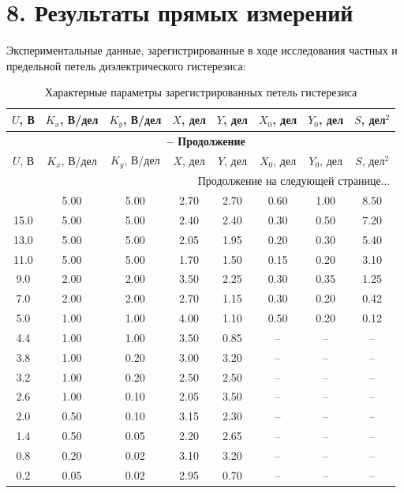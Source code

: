 \documentclass[a4paper,12pt]{article}
\begin{document}
\section*{\hspace{30pt}8. Результаты прямых измерений}
\hspace{15pt} Экспериментальные данные, зарегистрированные в ходе исследования частных и предельной петель диэлектрического гистерезиса:
\begin{longtable}{|c|c|c|c|c|c|c|c|}
    \caption{Характерные параметры зарегистрированных петель гистерезиса} \label{tab:raw_data_306} \\
    \hline
    $U$, В & $K_x$, В/дел & $K_y$, В/дел & $X$, дел & $Y$, дел & $X_0$, дел & $Y_0$, дел & $S$, дел$^2$ \\ \hline
    \endfirsthead
    \multicolumn{8}{c}{{\bfseries \tablename\ \thetable{} -- Продолжение}} \\ \hline
    $U$, В & $K_x$, В/дел & $K_y$, В/дел & $X$, дел & $Y$, дел & $X_0$, дел & $Y_0$, дел & $S$, дел$^2$ \\ \hline
    \endhead
    \hline \multicolumn{8}{|r|}{{Продолжение на следующей странице...}} \\ \hline
    \endfoot
    \hline
    \endlastfoot
    17.0 & 5.00 & 5.00 & 2.70 & 2.70 & 0.60 & 1.00 & 8.50 \\ \hline
    15.0 & 5.00 & 5.00 & 2.40 & 2.40 & 0.30 & 0.50 & 7.20 \\ \hline
    13.0 & 5.00 & 5.00 & 2.05 & 1.95 & 0.20 & 0.30 & 5.40 \\ \hline
    11.0 & 5.00 & 5.00 & 1.70 & 1.50 & 0.15 & 0.20 & 3.10 \\ \hline
    9.0  & 2.00 & 2.00 & 3.50 & 2.25 & 0.30 & 0.35 & 1.25 \\ \hline
    7.0  & 2.00 & 2.00 & 2.70 & 1.15 & 0.30 & 0.20 & 0.42 \\ \hline
    5.0  & 1.00 & 1.00 & 4.00 & 1.10 & 0.50 & 0.20 & 0.12 \\ \hline
    4.4  & 1.00 & 1.00 & 3.50 & 0.85 & --   & --   & --   \\ \hline
    3.8  & 1.00 & 0.20 & 3.00 & 3.20 & --   & --   & --   \\ \hline
    3.2  & 1.00 & 0.20 & 2.50 & 2.50 & --   & --   & --   \\ \hline
    2.6  & 1.00 & 0.10 & 2.05 & 3.50 & --   & --   & --   \\ \hline
    2.0  & 0.50 & 0.10 & 3.15 & 2.30 & --   & --   & --   \\ \hline
    1.4  & 0.50 & 0.05 & 2.20 & 2.65 & --   & --   & --   \\ \hline
    0.8  & 0.20 & 0.02 & 3.10 & 3.20 & --   & --   & --   \\ \hline
    0.2  & 0.05 & 0.02 & 2.95 & 0.70 & --   & --   & --   \\ \hline
\end{longtable}
\end{document}

